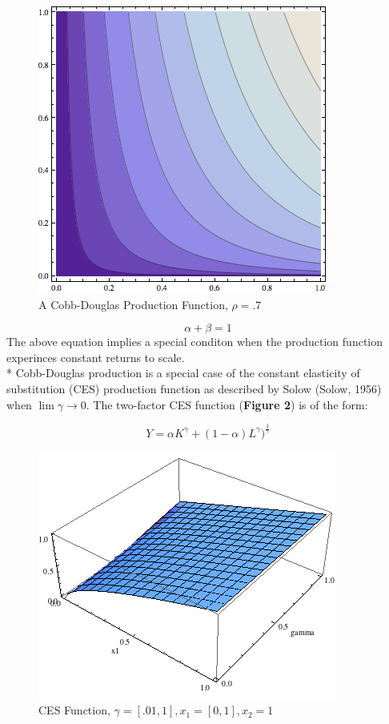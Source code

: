 \documentclass{article}
\begin{document}
\begin{figure}[!ht]
\begin{center}
\includegraphics[scale=.5]{Figures/CobbDouglas}
\caption{A Cobb-Douglas Production Function, $\rho = .7$}
\end{center}
\end{figure}

$$ \alpha + \beta = 1 $$
The above equation implies a special conditon when the production function experinces constant returns to scale. \\*
Cobb-Douglas production is a special case of the constant elasticity of substitution (CES) production function as described by Solow (Solow, 1956) when $\lim{\gamma \to 0}$. The two-factor CES function ({\bf Figure 2}) is of the form:

$$
Y = \alpha K^{\gamma} + (1-\alpha) L^{\gamma})^{\frac{1}{\gamma}}
$$

\begin{figure}[!ht]
	\begin{center}
	\includegraphics[scale=0.5]{Figures/CES.png}
	\caption{CES Function, $\gamma = [.01,1], x_{1} = [0,1], x_{2} = 1 $}
	\end{center}
\end{figure}
\*
\end{document}
